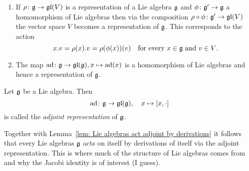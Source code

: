 \begin{expls}
\begin{enumerate}[leftmargin=*]
  \item
   If $\rho \colon \mathfrak{g} \to \mathfrak{gl}(V)$ is a representation of a Lie algebra $\mathfrak{g}$ and $\phi \colon \mathfrak{g}' \to \mathfrak{g}$ a homomorphism of Lie algebras then via the composition $\rho \circ \phi \colon \mathfrak{g}' \to \mathfrak{gl}(V)$ the vector space $V$ becomes a representation of $\mathfrak{g}$. This corresponds to the action
   \[
    x.v = \rho(x).v = \rho(\phi(x))(v) \quad \text{for every $x \in \mathfrak{g}$ and $v \in V$}.
   \]
   
  \item
   The map $\operatorname{ad} \colon \mathfrak{g} \to \mathfrak{gl}(\mathfrak{g}), x \mapsto \operatorname{ad}(x)$ is a homomorphism of Lie algebras and hence a representation of $\mathfrak{g}$.
 \end{enumerate}
\end{expls}


\begin{defi}
 Let $\mathfrak{g}$ be a Lie algebra. Then
 \[
  \operatorname{ad} \colon \mathfrak{g} \to \mathfrak{gl}(\mathfrak{g}), \quad x \mapsto [x,\cdot]
 \]
 is called the \emph{adjoint representation} of $\mathfrak{g}$.
\end{defi}


\begin{rem}
 Together with Lemma~\ref{lem: Lie algebras act adjoint by derivations} it follows that every Lie algebras $\mathfrak{g}$ acts on itself by derivations of itself via the adjoint representation. This is where much of the structure of Lie algebras comes from and why the Jacobi identity is of interest (I guess).
\end{rem}


